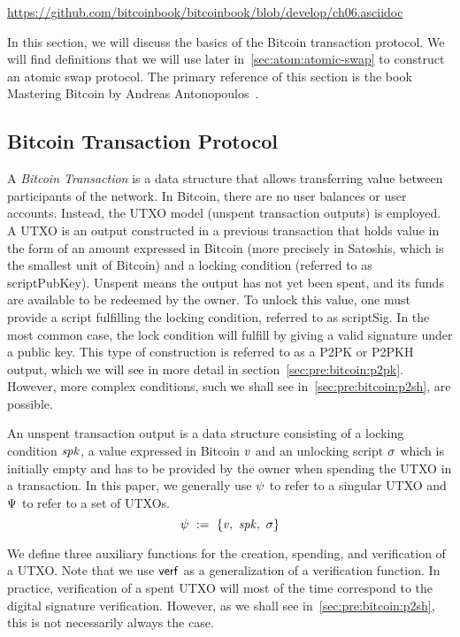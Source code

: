 \urldef\urlbtcbook\url{https://github.com/bitcoinbook/bitcoinbook/blob/develop/ch06.asciidoc}

In this section, we will discuss the basics of the Bitcoin transaction protocol.
We will find definitions that we will use later in~\cref{sec:atom:atomic-swap} to construct an atomic swap protocol.
The primary reference of this section is the book Mastering Bitcoin by Andreas Antonopoulos~\cite{antonopoulos2014mastering}.

\subsection{Bitcoin Transaction Protocol}\label{subsec:pre:bitcointx}

A \emph{Bitcoin Transaction} is a data structure that allows transferring value between participants of the network.
In Bitcoin, there are no user balances or user accounts.
Instead, the UTXO model (unspent transaction outputs) is employed.
A UTXO is an output constructed in a previous transaction that holds value in the form of an amount expressed in
Bitcoin (more precisely in Satoshis, which is the smallest unit of Bitcoin) and a locking condition (referred to as
scriptPubKey).
Unspent means the output has not yet been spent, and its funds are available to be redeemed by the owner.
To unlock this value, one must provide a script fulfilling the locking condition, referred to as scriptSig.
In the most common case, the lock condition will fulfill by giving a valid signature under a public key.
This type of construction is referred to as a P2PK or P2PKH output, which we will see in more detail in section~\cref{sec:pre:bitcoin:p2pk}.
However, more complex conditions, such we shall see in~\cref{sec:pre:bitcoin:p2sh}, are possible.

\begin{definition} An unspent transaction output is a data structure consisting of a locking condition $\mathit{spk}$, a value expressed in Bitcoin $\mathit{v}$ and an unlocking script $\mathit{\sigma}$ which is initially empty and has to be provided by the owner when spending the UTXO in a transaction.
In this paper, we generally use $\psi$ to refer to a singular UTXO and $\Psi$ to refer to a set of UTXOs.
    \[ \psi ~:=~ \{ \mathit{v} ,~ \mathit{spk} ,~ \mathit{\sigma} \} \]
\end{definition}

We define three auxiliary functions for the creation, spending, and verification of a UTXO.
Note that we use $\mathsf{verf}$ as a generalization of a verification function.
In practice, verification of a spent UTXO will most of the time correspond to the digital signature verification.
However, as we shall see in~\cref{sec:pre:bitcoin:p2sh}, this is not necessarily always the case.

